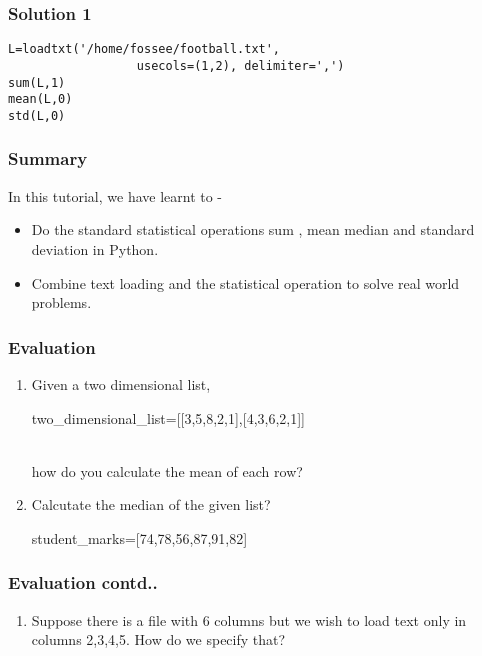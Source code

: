 \documentclass[17pt,compress]{beamer}
\newcounter{saveenumi}
\newcommand{\seti}{\setcounter{saveenumi}{\value{enumi}}}
\newcommand{\conti}{\setcounter{enumi}{\value{saveenumi}}}
\begin{document}
\begin{frame}[fragile]
\frametitle{Solution 1}
\label{sec-6}

\begin{small}
\lstset{language=Python}
\begin{lstlisting}
L=loadtxt('/home/fossee/football.txt',
		          usecols=(1,2), delimiter=',')
sum(L,1)
mean(L,0)
std(L,0)
\end{lstlisting}
\end{small}
\end{frame}
\begin{frame}
\frametitle{Summary}
\label{sec-7}

  In this tutorial, we have learnt to -


\begin{itemize}
\item Do the standard statistical operations sum , mean
    median and standard deviation in Python.
\item Combine text loading and the statistical operation to solve
    real world problems.
\end{itemize}
\end{frame}
\begin{frame}
\frametitle{Evaluation}
\label{sec-8}

\begin{enumerate}
\item Given a two dimensional list,\\
      \begin{small}two\_dimensional\_list=[[3,5,8,2,1],[4,3,6,2,1]]\end{small}\\
     how do you calculate the mean  of each row?\pause
\item Calcutate the median of the given list?\\
     \begin{small}student\_marks=[74,78,56,87,91,82]\end{small}
     \seti
\end{enumerate}
\end{frame}
\begin{frame}
\frametitle{Evaluation contd..}
\label{sec-8}

\begin{enumerate}
\conti
\item Suppose there is a file with 6 columns but we wish to load text 
     only in columns 2,3,4,5. How do we specify that?
\end{enumerate}
\end{frame}
\end{document}
